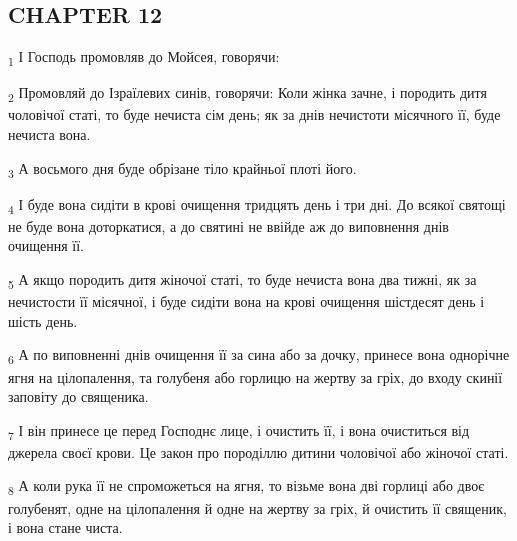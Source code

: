 \subsection{CHAPTER 12}
\begin{tcolorbox}
\textsubscript{1} І Господь промовляв до Мойсея, говорячи:
\end{tcolorbox}
\begin{tcolorbox}
\textsubscript{2} Промовляй до Ізраїлевих синів, говорячи: Коли жінка зачне, і породить дитя чоловічої статі, то буде нечиста сім день; як за днів нечистоти місячного її, буде нечиста вона.
\end{tcolorbox}
\begin{tcolorbox}
\textsubscript{3} А восьмого дня буде обрізане тіло крайньої плоті його.
\end{tcolorbox}
\begin{tcolorbox}
\textsubscript{4} І буде вона сидіти в крові очищення тридцять день і три дні. До всякої святощі не буде вона доторкатися, а до святині не ввійде аж до виповнення днів очищення її.
\end{tcolorbox}
\begin{tcolorbox}
\textsubscript{5} А якщо породить дитя жіночої статі, то буде нечиста вона два тижні, як за нечистости її місячної, і буде сидіти вона на крові очищення шістдесят день і шість день.
\end{tcolorbox}
\begin{tcolorbox}
\textsubscript{6} А по виповненні днів очищення її за сина або за дочку, принесе вона однорічне ягня на цілопалення, та голубеня або горлицю на жертву за гріх, до входу скинії заповіту до священика.
\end{tcolorbox}
\begin{tcolorbox}
\textsubscript{7} І він принесе це перед Господнє лице, і очистить її, і вона очиститься від джерела своєї крови. Це закон про породіллю дитини чоловічої або жіночої статі.
\end{tcolorbox}
\begin{tcolorbox}
\textsubscript{8} А коли рука її не спроможеться на ягня, то візьме вона дві горлиці або двоє голубенят, одне на цілопалення й одне на жертву за гріх, й очистить її священик, і вона стане чиста.
\end{tcolorbox}
